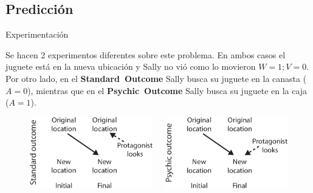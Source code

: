\documentclass{beamer}
\begin{document}
\subsection{Predicción}
\begin{frame}{Experimentación}

Se hacen 2 experimentos diferentes sobre este problema. En ambos casos el juguete está en la nueva ubicación y Sally no vió como lo movieron \( W = 1; V = 0 \). Por otro lado, en el \textbf{Standard~Outcome} Sally busca su juguete en la canasta (\( A = 0 \)), mientras que en el \textbf{Psychic~Outcome} Sally busca su juguete en la caja (\( A = 1 \)).

\begin{figure}
\begin{columns}
\begin{column}{.5\textwidth}
\includegraphics[width=\textwidth]{imagenes/standard_outcome.png}
\end{column}
\begin{column}{.5\textwidth}
\includegraphics[width=\textwidth]{imagenes/psychic_outcome.png}
\end{column}
\end{columns}
\label{outcome}
\end{figure}

\end{frame}
\end{document}
